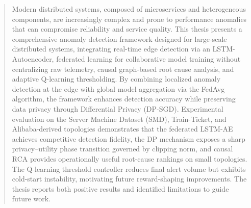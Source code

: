 \documentclass[12pt,a4paper]{report}
\begin{document}
\clearpage

\begin{abstract}
\noindent
Modern distributed systems, composed of microservices and heterogeneous
components, are increasingly complex and prone to performance anomalies that can
compromise reliability and service quality. This thesis presents a comprehensive
anomaly detection framework designed for large-scale distributed systems,
integrating real-time edge detection via an LSTM-Autoencoder, federated learning
for collaborative model training without centralizing raw telemetry,
causal graph-based root cause analysis, and adaptive Q-learning thresholding.
By combining localized anomaly detection at the edge with global model
aggregation via the FedAvg algorithm, the framework enhances detection accuracy
while preserving data privacy through Differential Privacy (DP-SGD).
Experimental evaluation on the Server Machine Dataset (SMD), Train-Ticket, and
Alibaba-derived topologies demonstrates that the federated LSTM-AE achieves
competitive detection fidelity, the DP mechanism exposes a sharp
privacy--utility phase transition governed by clipping norm, and causal RCA
provides operationally useful root-cause rankings on small topologies. The
Q-learning threshold controller reduces final alert volume but exhibits
cold-start instability, motivating future reward-shaping improvements. The
thesis reports both positive results and identified limitations to guide future
work.
\end{abstract}

\clearpage

\tableofcontents
\clearpage
\listoffigures
\clearpage
\listoftables
\clearpage









\printbibliography[heading=bibintoc, title={References}]
\end{document}
